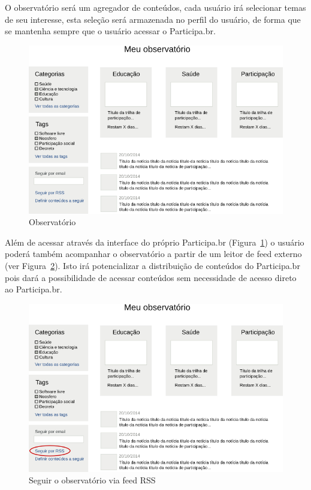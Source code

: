 \documentclass[12pt]{article}
\begin{document}
O observatório será um agregador de conteúdos, cada usuário irá selecionar
temas de seu interesse, esta seleção será armazenada no perfil do usuário, de
forma que se mantenha sempre que o usuário acessar o Participa.br.

\begin{figure}[h]
\center
\includegraphics[scale=0.60]{observatorio.png}
\caption{Observatório}
\label{observatorio}
\end{figure}

Além de acessar através da interface do próprio Participa.br
(Figura~\ref{observatorio}) o usuário poderá também acompanhar o observatório
a partir de um leitor de feed\cite{rss} externo (ver
Figura~\ref{observatorio-feed}). Isto irá potencializar a distribuição de
conteúdos do Participa.br pois dará a possibilidade de acessar conteúdos sem
necessidade de acesso direto ao Participa.br.

\begin{figure}[h]
\center
\includegraphics[scale=0.60]{observatorio-feed.png}
\caption{Seguir o observatório via feed RSS}
\label{observatorio-feed}
\end{figure}
\end{document}
